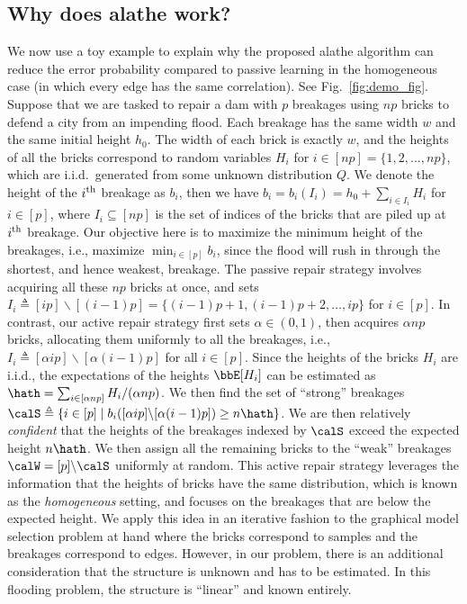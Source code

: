 \documentclass[11pt,onecolumn]{article}
\begin{document}
\subsection{Why does \ac{alathe} work?} \label{sec:work}
We now use a toy example to explain why the proposed \ac{alathe} algorithm can reduce the error probability compared to  passive learning in the homogeneous case (in which every edge has the same correlation). See Fig.~\ref{fig:demo_fig}. Suppose that we are tasked   to repair a dam with $p$ breakages using $np$ bricks to defend a city from an impending flood. Each breakage has the same width $w$ and the same initial height $h_{0}$. The width of each 
brick is exactly $w$, and the heights of all the bricks correspond to random variables $H_{i}$ for $i\in[np]=\{1,2,\ldots, np\}$, which are i.i.d.\ generated from some unknown distribution $Q$. We denote the height of the $i^{\rm th}$ breakage as $b_{i}$, then we have 
$b_{i}=b_{i}(I_{i})=h_{0}+\sum_{i\in I_{i}} H_{i}$ for $i\in[p]$, where $I_{i}\subseteq [np]$ is the set of indices of the bricks that are piled up at $i^{\rm th}$ breakage. Our objective here is to maximize the minimum height of the  breakages,  i.e., 
maximize $\min_{i\in[p]} b_{i}$, since the flood will rush in through the shortest, and hence weakest, breakage. The passive repair strategy involves acquiring all these $np$ bricks at once, and sets $I_{i} \triangleq [ip]\backslash[(i-1)p]=\{(i-1)p+1,(i-1)p+2,\ldots,ip\}$ for $i\in[p]$. 
In contrast, our active repair strategy first sets $\alpha \in (0,1)$, then acquires $\alpha np$ bricks, allocating them uniformly to all the breakages, i.e., $I_{i}\triangleq  [\alpha ip]\backslash[\alpha(i-1)p]$ for all $i\in [p]$. Since the heights of the bricks $H_i$ are i.i.d., the expectations of the heights $\bbE[H_i]$ 
can be estimated as $\hath=\sum_{i\in[\alpha np]} H_{i}/(\alpha np)$. We then find the set of ``strong'' breakages $\calS \triangleq \{i\in[p] \mid  b_{i}([\alpha ip]\backslash[\alpha(i-1)p])\geq n\hath\}$. We are then relatively \emph{confident} that 
the heights of the breakages indexed by $\calS$ exceed the expected height $n\hath$. We then assign all the remaining bricks to the ``weak'' breakages $\calW=[p]\backslash\calS$ uniformly at random. This active repair strategy leverages the information that the heights of  bricks have the same distribution, which is known as the \emph{homogeneous} setting, and focuses on the breakages that are below the expected height. We apply this idea in an iterative fashion to the graphical model selection problem at hand where the bricks correspond to samples and the breakages correspond to edges. However, in our problem, there is an additional consideration that the structure is unknown and has to be estimated. In this flooding problem, the structure is ``linear'' and known entirely.
\end{document}
